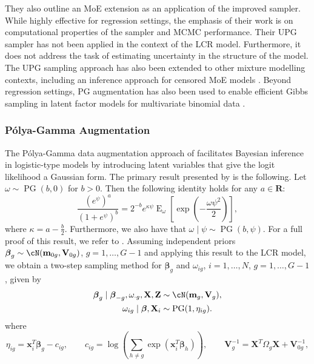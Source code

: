 \documentclass[11pt]{article}
\def\pg{\operatorname{PG}}
\def\Ex{\operatorname{E}}
\def\boldm{\mathbf{m}}
\def\boldx{\mathbf{x}}
\def\boldV{\mathbf{V}}
\def\boldX{\mathbf{X}}
\def\boldZ{\mathbf{Z}}
\def\bsbet{\boldsymbol{\beta}}
\theoremstyle{plain}
\theoremstyle{definition}
\begin{document}
They also outline an MoE extension as an application of the improved sampler. While highly effective for regression settings, the emphasis of their work is on computational properties of the sampler and MCMC performance. Their UPG sampler has not been applied in the context of the LCR model. Furthermore, it does not address the task of estimating uncertainty in the structure of the model. The UPG sampling approach has also been extended to other mixture modelling contexts, including an inference approach for censored MoE models \citep{mirfarah_robust_2024}. Beyond regression settings, PG augmentation has also been used to enable efficient Gibbs sampling in latent factor models for multivariate binomial data \citep{holmes_polya-gamma_2022}.
\subsubsection{Pólya-Gamma Augmentation}\label{subsec:pg_augmentation} 
The Pólya-Gamma data augmentation approach of \citet{polson_bayesian_2013} facilitates Bayesian inference in logistic-type models by introducing latent variables that give the logit likelihood a Gaussian form.
The primary result presented by \citet{polson_bayesian_2013} is the following. Let $\omega \sim \pg(b,0)$ for $b>0$. Then the following identity holds for any $a \in \mathbf{R}$:
\begin{equation}\label{pgresult}
\frac{(e^{\psi})^a}{(1+e^{\psi})^b}  
    = 2^{-b} e^{\kappa \psi} \Ex_{\omega}\left[ \exp\left(-\frac{\omega \psi^2}{2}\right) \right],
\end{equation}
where $\kappa = a-\frac{b}{2}$. Furthermore, we also have that $\omega \mid \psi \sim \pg(b,\psi)$. For a full proof of this result, we refer to \cite{polson_bayesian_2013}. Assuming independent priors $\bsbet_g \sim \cN(\boldm_{0g}, \boldV_{0g})$, $g = 1,\dots,G-1$ and applying this result to the LCR model, we obtain a two-step sampling method for $\bsbet_g$ and $\omega_{ig}$, $i = 1,\dots, N$, $g = 1, \dots, G-1$, given by
\begin{equation}\label{LCR_beta_sampling}
 \begin{aligned}
    \bsbet_g \mid \bsbet_{-g}, \omega_{\cdot g}, \boldX,\boldZ  &\sim \cN(\mathbf{m}_g, \mathbf{V}_g),\\
    \omega_{ig} \mid \bsbet, \boldX_i &\sim \pg(1,\eta_{ig}).
\end{aligned}
\end{equation}
where
\[
\eta_{ig} = \boldx_i^T\bsbet_g - c_{ig}, \qquad c_{ig} = \log\left( \sum_{h \neq g} \exp(\boldx_i^T \bsbet_h) \right), \qquad \mathbf{V}_g^{-1} = \boldX^T \Omega_g \boldX + \boldV_{0g}^{-1},
\]
\end{document}
